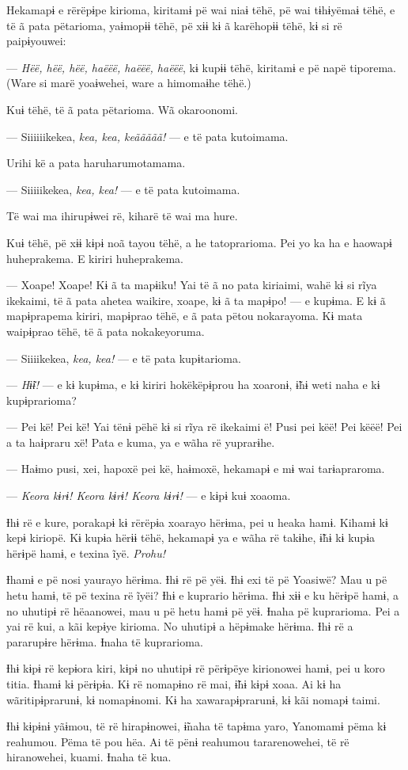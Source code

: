 Hekamapɨ e rërëpɨpe kirioma, kiritamɨ pë wai niaɨ tëhë, pë wai tɨhɨyëmaɨ
tëhë, e të ã pata pëtarioma, yaɨmopɨɨ tëhë, pë xɨɨ kɨ ã karëhopɨɨ tëhë,
kɨ si rë paipɨyouwei: 

--- \textit{Hëë, hëë, hëë, haëëë, haëëë, haëëë}, kɨ kupɨɨ tëhë, kiritamɨ e pë
napë tiporema. (Ware si marë yoaɨwehei, ware a himomaɨhe tëhë.) 

Kuɨ tëhë, të ã pata pëtarioma. Wã okaroonomi. 

--- Siiiiiikekea, \textit{kea, kea, keããããã!} --- e të pata kutoimama. 

Urihi kë a pata haruharumotamama. 

--- Siiiiikekea, \textit{kea, kea!} --- e të pata kutoimama. 

Të wai ma ihirupɨwei rë, kiharë të wai ma hure. 

Kuɨ tëhë, pë xɨɨ kɨpɨ noã tayou tëhë, a he tatoprarioma. Pei yo ka ha e
haowapɨ huheprakema. E kiriri huheprakema. 

--- Xoape! Xoape! Kɨ ã ta mapɨiku! Yai të ã no pata kiriaimi, wahë kɨ si
 rĩya ikekaimi, të ã pata ahetea waikire, xoape, kɨ ã ta mapɨpo! --- e
 kupɨma. E kɨ ã mapɨprapema kiriri, mapɨprao tëhë, e ã pata pëtou
 nokarayoma. Kɨ mata waipɨprao tëhë, të ã pata nokakeyoruma. 

--- Siiiikekea, \textit{kea, kea!} --- e të pata kupɨtarioma. 

--- \textit{Hɨ̃ɨ!} --- e kɨ kupɨma, e kɨ kiriri hokëkëpɨprou ha xoaronɨ, ɨ̃hɨ weti
naha e kɨ kupɨprarioma?

--- Pei kë! Pei kë! Yai tënɨ pëhë kɨ si rĩya rë ikekaimi ë! Pusi pei
këë! Pei këëë! Pei a ta haɨpraru xë! Pata e kuma, ya e wãha rë
yuprarɨhe.

--- Haɨmo pusi, xei, hapoxë pei kë, haɨmoxë, hekamapɨ e mɨ wai
tarɨapraroma. 

--- \textit{Keora kɨrɨ! Keora kɨrɨ! Keora kɨrɨ!} --- e kɨpɨ kuɨ xoaoma. 

Ɨhɨ rë e kure, porakapɨ kɨ rërëpɨa xoarayo hërɨma, pei u heaka hamɨ.
 Kihamɨ kɨ kepɨ kiriopë. Kɨ kupɨa hërɨɨ tëhë, hekamapɨ ya e wãha rë
 takɨhe, ɨ̃hɨ kɨ kupɨa hërɨpë hamɨ, e texina ĩyë. \textit{Prohu!}

Ɨhamɨ e pë nosi yaurayo hërɨma. Ɨhɨ rë pë yëɨ. Ɨhɨ exi të pë Yoasiwë?
Mau u pë hetu hamɨ, të pë texina rë ĩyëi? Ɨhɨ e kuprario hërɨma. Ɨhɨ xɨɨ
e ku hërɨpë hamɨ, a no uhutipɨ rë hëaanowei, mau u pë hetu hamɨ pë yëɨ.
Ɨnaha pë kuprarioma. Pei a yai rë kui, a kãi kepɨye kirioma. No uhutipɨ
a hëpɨmake hërɨma. Ɨhɨ rë a pararupɨre hërɨma. Ɨnaha të kuprarioma. 

Ɨhɨ kɨpɨ rë kepɨora kiri, kɨpɨ no uhutipɨ rë përɨpëye kirionowei hamɨ,
pei u koro titia. Ɨhamɨ kɨ përɨpɨa. Kɨ rë nomapɨno rë mai, ɨ̃hɨ kɨpɨ
xoaa. Ai kɨ ha wãritipɨprarunɨ, kɨ nomapɨnomi. Kɨ ha xawarapɨprarunɨ, kɨ
kãi nomapɨ taimi. 

Ɨhɨ kɨpɨnɨ yãɨmou, të rë hirapɨnowei, ɨ̃naha të tapɨma yaro, Yanomamɨ
pëma kɨ reahumou. Pëma të pou hëa. Ai të pënɨ reahumou tararenowehei, të
rë hiranowehei, kuami. Ɨnaha të kua.
